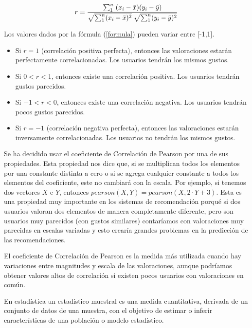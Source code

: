\documentclass{uimppracticas}
\begin{document}
\begin{equation}\label{formula}
	\large r = \frac{\sum_{1}^{n} \; (x_{i} - \bar{x}) (y_{i} - \bar{y})}{\sqrt{\sum_{1}^{n}(x_{i} - \bar{x})^2} \; \sqrt{\sum_{1}^{n}(y_{i} - \bar{y})^2}}
\end{equation}

Los valores dados por la fórmula (\ref{formula}) pueden variar entre [-1,1].

\begin{itemize}
	\item Si $r=1$ (correlación positiva perfecta), entonces las valoraciones estarán perfectamente correlacionadas. Los usuarios tendrán los mismos gustos.
	\item Si $0<r<1$, entonces existe una correlación positiva. Los usuarios tendrán gustos parecidos.
	\item Si $-1<r<0$, entonces existe una correlación negativa. Los usuarios tendrán pocos gustos parecidos.
	\item Si $r=-1$ (correlación negativa perfecta), entonces las valoraciones estarán inversamente correlacionadas. Los usuarios no tendrán los mismos gustos.
\end{itemize}

Se ha decidido usar el coeficiente de Correlación de Pearson por una de sus propiedades. Esta propiedad nos dice que, si se multiplican todos los elementos por una constante distinta a cero o si se agrega cualquier constante a todos los elementos del coeficiente, este no cambiará con la escala. Por ejemplo, si tenemos dos vectores $X$ e $Y$, entonces $pearson(X,Y) = pearson(X,2\cdot Y+3)$. Esta es una propiedad muy importante en los sistemas de recomendación porqué si dos usuarios valoran dos elementos de manera completamente diferente, pero son usuarios muy parecidos (con gustos similares) contaríamos con valoraciones muy parecidas en escalas variadas y esto crearía grandes problemas en la predicción de las recomendaciones. 

El coeficiente de Correlación de Pearson es la medida más utilizada cuando hay variaciones entre magnitudes y escala de las valoraciones, aunque podríamos obtener valores altos de correlación si existen pocos usuarios con valoraciones en común.

\begin{definition}\label{estadístico_muestral}
En estadística un estadístico muestral es una medida cuantitativa, derivada de un conjunto de datos de una muestra, con el objetivo de estimar o inferir características de una población o modelo estadístico.
\end{definition}
\end{document}
